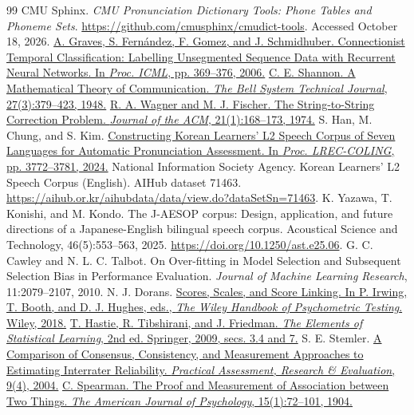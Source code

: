 \documentclass[10pt]{article}
\begin{document}
\begin{thebibliography}{99}
 CMU Sphinx. \textit{CMU Pronunciation Dictionary Tools: Phone Tables and Phoneme Sets}. \url{https://github.com/cmusphinx/cmudict-tools}. Accessed October 18, 2026.
 \href{https://doi.org/10.1145/1143844.1143891}{A. Graves, S. Fern\'andez, F. Gomez, and J. Schmidhuber. Connectionist Temporal Classification: Labelling Unsegmented Sequence Data with Recurrent Neural Networks. In \textit{Proc. ICML}, pp. 369--376, 2006.}
 \href{https://doi.org/10.1002/j.1538-7305.1948.tb01338.x}{C. E. Shannon. A Mathematical Theory of Communication. \textit{The Bell System Technical Journal}, 27(3):379--423, 1948.}
 \href{https://doi.org/10.1145/321796.321811}{R. A. Wagner and M. J. Fischer. The String-to-String Correction Problem. \textit{Journal of the ACM}, 21(1):168--173, 1974.}
 S. Han, M. Chung, and S. Kim. \href{https://aclanthology.org/2024.lrec-main.334/}{Constructing Korean Learners' L2 Speech Corpus of Seven Languages for Automatic Pronunciation Assessment. In \textit{Proc. LREC-COLING}, pp. 3772--3781, 2024.}
 National Information Society Agency. Korean Learners' L2 Speech Corpus (English). AIHub dataset 71463. \url{https://aihub.or.kr/aihubdata/data/view.do?dataSetSn=71463}.
 K. Yazawa, T. Konishi, and M. Kondo. The J-AESOP corpus: Design, application, and future directions of a Japanese-English bilingual speech corpus. Acoustical Science and Technology, 46(5):553--563, 2025. \url{https://doi.org/10.1250/ast.e25.06}.
 G. C. Cawley and N. L. C. Talbot. On Over-fitting in Model Selection and Subsequent Selection Bias in Performance Evaluation. \textit{Journal of Machine Learning Research}, 11:2079--2107, 2010.
 N. J. Dorans. \href{https://doi.org/10.1002/9781118489772.ch19}{Scores, Scales, and Score Linking. In P. Irwing, T. Booth, and D. J. Hughes, eds., \textit{The Wiley Handbook of Psychometric Testing}. Wiley, 2018.}
 \href{https://doi.org/10.1007/978-0-387-84858-7}{T. Hastie, R. Tibshirani, and J. Friedman. \textit{The Elements of Statistical Learning}, 2nd ed. Springer, 2009, secs. 3.4 and 7.}
 S. E. Stemler. \href{https://doi.org/10.7275/zrjx-8p89}{A Comparison of Consensus, Consistency, and Measurement Approaches to Estimating Interrater Reliability. \textit{Practical Assessment, Research \& Evaluation}, 9(4), 2004.}
 \href{https://doi.org/10.2307/1412159}{C. Spearman. The Proof and Measurement of Association between Two Things. \textit{The American Journal of Psychology}, 15(1):72--101, 1904.}

\end{thebibliography}
\end{document}
